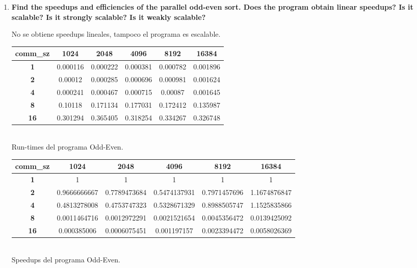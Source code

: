 \documentclass[a4paper,12pt]{article}
\begin{document}
\begin{enumerate}
\begin{lstlisting}
		free(vector);
	}
	printf("Count->%d\n",count);
}
\end{lstlisting}

\item \textbf{Find the speedups and efficiencies of the parallel odd-even sort. Does the program obtain
linear speedups? Is it scalable? Is it strongly scalable? Is it weakly scalable?}

No se obtiene speedups lineales, tampoco el programa es escalable.

\begin{center}
\begin{tabular}{|c|c|c|c|c|c|}\hline
\textbf{comm\_sz} & \textbf{1024} & \textbf{2048} & \textbf{4096} & \textbf{8192} & \textbf{16384}\\\hline
\textbf{1} & 0.000116 & 0.000222 & 0.000381 & 0.000782 & 0.001896\\\hline
\textbf{2} & 0.00012 & 0.000285 & 0.000696 & 0.000981 & 0.001624\\\hline
\textbf{4} & 0.000241 & 0.000467 & 0.000715 & 0.00087 & 0.001645\\\hline
\textbf{8} & 0.10118 & 0.171134 & 0.177031 & 0.172412 & 0.135987\\\hline
\textbf{16} & 0.301294 & 0.365405 & 0.318254 & 0.334267 & 0.326748\\\hline
\end{tabular}
\\
Run-times del programa Odd-Even.
\end{center}

\begin{center}
\begin{tabular}{|c|c|c|c|c|c|}\hline
\textbf{comm\_sz} & \textbf{1024} & \textbf{2048} & \textbf{4096} & \textbf{8192} & \textbf{16384}\\\hline
\textbf{1} & 1 & 1 & 1 & 1 & 1\\\hline
\textbf{2} & 0.9666666667 & 0.7789473684 & 0.5474137931 & 0.7971457696 & 1.1674876847\\\hline
\textbf{4} & 0.4813278008 & 0.4753747323 & 0.5328671329 & 0.8988505747 & 1.1525835866\\\hline
\textbf{8} & 0.0011464716 & 0.0012972291 & 0.0021521654 & 0.0045356472 & 0.0139425092\\\hline
\textbf{16} & 0.000385006 & 0.0006075451 & 0.001197157 & 0.0023394472 & 0.0058026369\\\hline
\end{tabular}
\\
Speedups del programa Odd-Even.
\end{center}



\end{enumerate}
\end{document}
